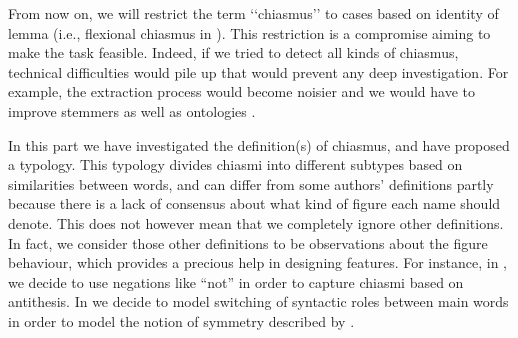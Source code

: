 





From now on, we will restrict the term `‘chiasmus’' to cases based on identity of lemma  (i.e., flexional chiasmus in ). This restriction is a compromise aiming to make the task feasible. Indeed, if we tried to detect all kinds of chiasmus, technical difficulties would pile up  that would prevent any deep investigation. For example, the extraction process would become noisier and we would have to improve stemmers as well as ontologies \citep{dubremetz2013}.

In this part we have investigated the definition(s) of chiasmus, and have proposed a typology. This typology divides chiasmi into different subtypes based on similarities between words, and can differ from some authors' definitions partly because there is a lack of consensus about what kind of figure each name should denote. This does not however mean that we completely ignore other definitions. In fact, we consider those other definitions to be observations about the figure behaviour, which provides a precious help in designing features. For instance, in , we decide to use negations like ``not'' in order to capture chiasmi based on antithesis. In  we decide to model switching of  syntactic roles between main words in order to model the notion of symmetry described by \cite{morier}.

